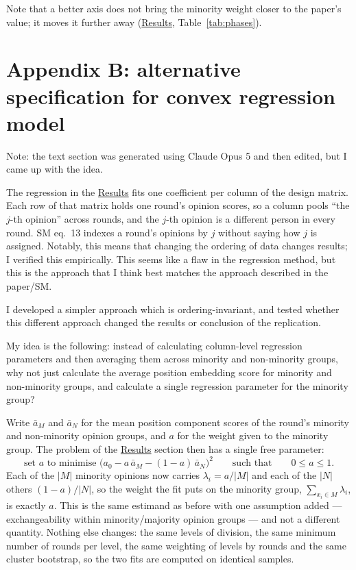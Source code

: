 \documentclass[11pt,a4paper]{article}
\begin{document}
Note that a better axis does not bring the minority weight closer to the paper's value; it moves it further away
(\hyperref[sec:results]{Results}, Table~\ref{tab:phases}).

\clearpage
\section*{Appendix B: alternative specification for convex regression model}
\label{app:blocks}

Note: the text section was generated using Claude Opus 5 and then edited, but I came up with the idea.

The regression in the \hyperref[sec:results]{Results} fits one coefficient per column of the design
matrix. Each row of that matrix holds one round's opinion scores, so a column pools ``the $j$-th
opinion'' across rounds, and the $j$-th opinion is a different person in every round. SM eq.~13
indexes a round's opinions by $j$ without saying how $j$ is assigned. 
Notably, this means that changing the ordering of data changes results; I verified this empirically.
This seems like a flaw in the regression method, but this is the approach that I think best matches the approach described in the paper/SM.

I developed a simpler approach which is ordering-invariant, and tested whether this different approach changed the results or conclusion of the replication.

My idea is the following: instead of calculating column-level regression parameters and then averaging them across minority and non-minority groups, why not
just calculate the average position embedding score for minority and non-minority groups, and calculate a single regression parameter for the minority group?

Write $\bar a_M$ and $\bar a_N$ for the mean position component scores of the round's
minority and non-minority opinion groups, and $a$ for the weight given to the minority group. The problem
of the \hyperref[sec:results]{Results} section then has a single free parameter:
%
\begin{equation*}
\text{set } a \text{ to minimise } \Big(a_0 - a\,\bar a_M - (1-a)\,\bar a_N\Big)^2
\qquad\text{such that}\qquad 0 \leq a \leq 1 .
\end{equation*}
%
Each of the $|M|$ minority opinions now carries $\lambda_i = a/|M|$ and each of the $|N|$ others
$(1-a)/|N|$, so the weight the fit puts on the minority group, $\sum_{x_i \in M} \lambda_i$, is
exactly $a$. This is the same estimand as before with one assumption added --- exchangeability
within minority/majority opinion groups --- and not a different quantity. Nothing else changes: the same levels of division,
the same minimum number of rounds per level, the same weighting of levels by rounds and the same
cluster bootstrap, so the two fits are computed on identical samples.
\end{document}
